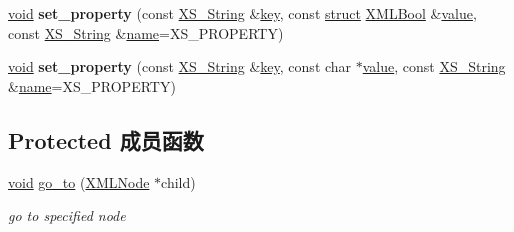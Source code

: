 \begin{DoxyCompactItemize}
\item 
\mbox{\label{struct_x_m_l_storage_1_1_x_m_l_pos_a1351a08aafca5a89df8fddd0c82ef61a}} 
\hyperlink{interfacevoid}{void} {\bfseries set\+\_\+property} (const \hyperlink{struct_x_m_l_storage_1_1_x_s___string}{X\+S\+\_\+\+String} \&\hyperlink{structkey}{key}, const \hyperlink{interfacestruct}{struct} \hyperlink{struct_x_m_l_storage_1_1_x_m_l_bool}{X\+M\+L\+Bool} \&\hyperlink{unionvalue}{value}, const \hyperlink{struct_x_m_l_storage_1_1_x_s___string}{X\+S\+\_\+\+String} \&\hyperlink{structname}{name}=X\+S\+\_\+\+P\+R\+O\+P\+E\+R\+TY)
\item 
\mbox{\label{struct_x_m_l_storage_1_1_x_m_l_pos_a87fd4d3dcbafd3001abfd046c91dc474}} 
\hyperlink{interfacevoid}{void} {\bfseries set\+\_\+property} (const \hyperlink{struct_x_m_l_storage_1_1_x_s___string}{X\+S\+\_\+\+String} \&\hyperlink{structkey}{key}, const char $\ast$\hyperlink{unionvalue}{value}, const \hyperlink{struct_x_m_l_storage_1_1_x_s___string}{X\+S\+\_\+\+String} \&\hyperlink{structname}{name}=X\+S\+\_\+\+P\+R\+O\+P\+E\+R\+TY)
\end{DoxyCompactItemize}
\subsection*{Protected 成员函数}
\begin{DoxyCompactItemize}
\item 
\mbox{\label{struct_x_m_l_storage_1_1_x_m_l_pos_a6fbac3aed6457198ac6d146ff1256b82}} 
\hyperlink{interfacevoid}{void} \hyperlink{struct_x_m_l_storage_1_1_x_m_l_pos_a6fbac3aed6457198ac6d146ff1256b82}{go\+\_\+to} (\hyperlink{struct_x_m_l_storage_1_1_x_m_l_node}{X\+M\+L\+Node} $\ast$child)
\begin{DoxyCompactList}\small\item\em go to specified node \end{DoxyCompactList}\end{DoxyCompactItemize}
